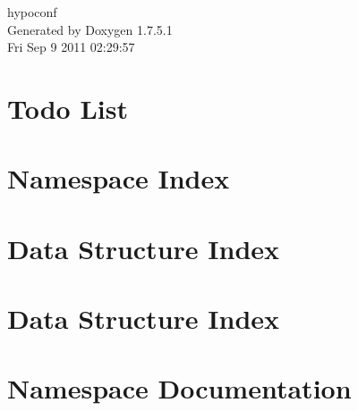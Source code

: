 \documentclass[a4paper]{book}
\begin{document}
\hypersetup{pageanchor=false,citecolor=blue}
\begin{titlepage}
\vspace*{7cm}
\begin{center}
{\Large hypoconf }\\
\vspace*{1cm}
{\large \-Generated by Doxygen 1.7.5.1}\\
\vspace*{0.5cm}
{\small Fri Sep 9 2011 02:29:57}\\
\end{center}
\end{titlepage}
\clearemptydoublepage
{}
\tableofcontents
\clearemptydoublepage
{}
\hypersetup{pageanchor=true,citecolor=blue}
\chapter{\-Todo \-List}
\label{todo}
\hypertarget{todo}{}

\chapter{\-Namespace \-Index}

\chapter{\-Data \-Structure \-Index}

\chapter{\-Data \-Structure \-Index}

\chapter{\-Namespace \-Documentation}







\end{document}
